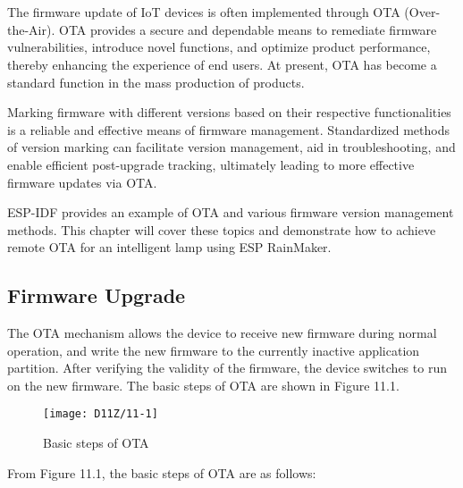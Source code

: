 \documentclass[a4paper,12pt]{book}
\begin{document}

\chapter[Firmware Upgrade and Version Management]{}

\vspace{36pt}
The firmware update of IoT devices is often implemented through OTA (Over-the-Air). OTA provides a secure and dependable means to remediate firmware vulnerabilities, introduce novel functions, and optimize product performance, thereby enhancing the experience of end users. At present, OTA has become a standard function in the mass production of products.

Marking firmware with different versions based on their respective functionalities is a reliable and effective means of firmware management. Standardized methods of version marking can facilitate version management, aid in troubleshooting, and enable efficient post-upgrade tracking, ultimately leading to more effective firmware updates via OTA.

ESP-IDF provides an example of OTA and various firmware version management methods. This chapter will cover these topics and demonstrate how to achieve remote OTA for an intelligent lamp using ESP RainMaker.

\section{Firmware Upgrade}
The OTA mechanism allows the device to receive new firmware during normal operation, and write the new firmware to the currently inactive application partition. After verifying the validity of the firmware, the device switches to run on the new firmware. The basic steps of OTA are shown in Figure 11.1.

\begin{figure}[!h]
    \centering
    \texttt{[image: D11Z/11-1]}
    \caption{Basic steps of OTA}
\end{figure}

From Figure 11.1, the basic steps of OTA are as follows:
\end{document}
